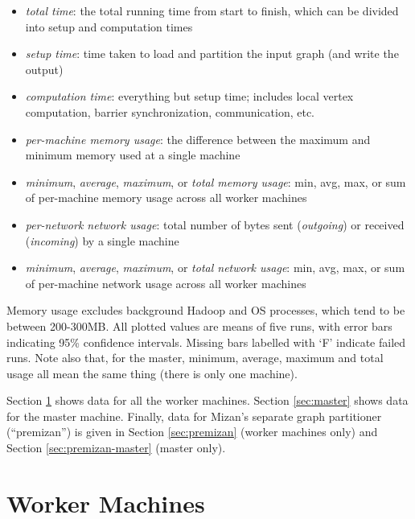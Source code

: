 \documentclass{article}
\newcommand{\bline}[1][1]{\vspace{#1\baselineskip}}
\begin{document}
\begin{itemize}
  \setlength{\itemsep}{-3pt}
\item \textit{total time}: the total running time from start to finish, which can be divided into setup and computation times
\item \textit{setup time}: time taken to load and partition the input graph (and write the output)
\item \textit{computation time}: everything but setup time; includes local vertex computation, barrier synchronization, communication, etc.
\bline[0.5]
\item \textit{per-machine memory usage}: the difference between the maximum and minimum memory used at a single machine
\item \textit{minimum}, \textit{average}, \textit{maximum}, or \textit{total memory usage}: min, avg, max, or sum of per-machine memory usage across all worker machines
\bline[0.5]
\item \textit{per-network network usage}: total number of bytes sent (\textit{outgoing}) or received (\textit{incoming}) by a single machine
\item \textit{minimum}, \textit{average}, \textit{maximum}, or \textit{total network usage}: min, avg, max, or sum of per-machine network usage across all worker machines
\end{itemize}

\noindent Memory usage excludes background Hadoop and OS processes, which tend to be between 200-300MB. All plotted values are means of five runs, with error bars indicating 95\% confidence intervals. Missing bars labelled with `F' indicate failed runs. Note also that, for the master, minimum, average, maximum and total usage all mean the same thing (there is only one machine).

\bline
Section \ref{sec:workers} shows data for all the worker machines. Section \ref{sec:master} shows data for the master machine. Finally, data for Mizan's separate graph partitioner (``premizan'') is given in Section \ref{sec:premizan} (worker machines only) and Section \ref{sec:premizan-master} (master only).


\pagebreak
\section{Worker Machines}
\label{sec:workers}
\end{document}
